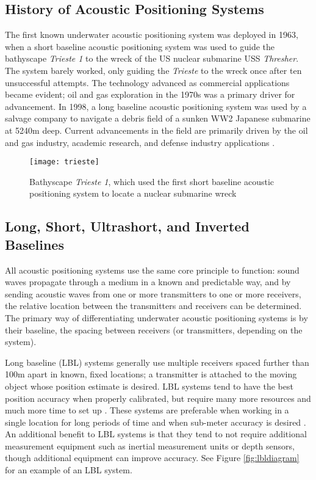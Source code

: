 \documentclass[12pt,a4paper]{report}
\begin{document}
\subsection{History of Acoustic Positioning Systems} \label{ssec:3s1s1}
The first known underwater acoustic positioning system was deployed in 1963, when a short baseline acoustic positioning system was used to guide the bathyscape \emph{Trieste 1} to the wreck of the US nuclear submarine USS \emph{Thresher}. The system barely worked, only guiding the \textit{Trieste} to the wreck once after ten unsuccessful attempts. The technology advanced as commercial applications became evident; oil and gas exploration in the 1970s was a primary driver for advancement. In 1998, a long baseline acoustic positioning system was used by a salvage company to navigate a debris field of a sunken WW2 Japanese submarine at 5240m deep. Current advancements in the field are primarily driven by the oil and gas industry, academic research, and defense industry applications \cite{apomab}.

\begin{figure}[htbp]
	\centering
	\texttt{[image: trieste]}
	\caption{Bathyscape \textit{Trieste 1}, which used the first short baseline acoustic positioning system to locate a nuclear submarine wreck \cite{apomab}}
	\label{fig:trieste}
\end{figure}

\subsection{Long, Short, Ultrashort, and Inverted Baselines} \label{ssec:3s1s2}
All acoustic positioning systems use the same core principle to function: sound waves propagate through a medium in a known and predictable way, and by sending acoustic waves from one or more transmitters to one or more receivers, the relative location between the transmitters and receivers can be determined. The primary way of differentiating underwater acoustic positioning systems is by their baseline, the spacing between receivers (or transmitters, depending on the system).

Long baseline (LBL) systems generally use multiple receivers spaced further than 100m apart in known, fixed locations; a transmitter is attached to the moving object whose position estimate is desired. LBL systems tend to have the best position accuracy when properly calibrated, but require many more resources and much more time to set up \cite{practicaloverview}. These systems are preferable when working in a single location for long periods of time and when sub-meter accuracy is desired \cite{apomab}. An additional benefit to LBL systems is that they tend to not require additional measurement equipment such as inertial measurement units or depth sensors, though additional equipment can improve accuracy. See Figure \ref{fig:lbldiagram} for an example of an LBL system.
\end{document}

